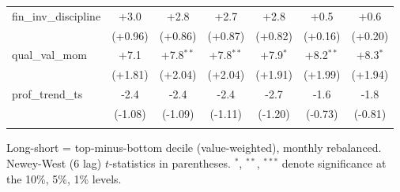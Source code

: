 \begin{table}[htbp]
\begin{threeparttable}
\begin{tabular}{lcccccc}
\addlinespace
fin\_inv\_discipline & +3.0 & +2.8 & +2.7 & +2.8 & +0.5 & +0.6 \\
 & (+0.96) & (+0.86) & (+0.87) & (+0.82) & (+0.16) & (+0.20) \\
\addlinespace
qual\_val\_mom & +7.1 & +7.8$^{**}$ & +7.8$^{**}$ & +7.9$^{*}$ & +8.2$^{**}$ & +8.3$^{*}$ \\
 & (+1.81) & (+2.04) & (+2.04) & (+1.91) & (+1.99) & (+1.94) \\
\addlinespace
prof\_trend\_ts & -2.4 & -2.4 & -2.4 & -2.7 & -1.6 & -1.8 \\
 & (-1.08) & (-1.09) & (-1.11) & (-1.20) & (-0.73) & (-0.81) \\
\addlinespace
\bottomrule
\end{tabular}
\begin{tablenotes}\footnotesize
\item Long-short = top-minus-bottom decile (value-weighted), monthly rebalanced. Newey-West (6 lag) $t$-statistics in parentheses. $^{*}$, $^{**}$, $^{***}$ denote significance at the 10\%, 5\%, 1\% levels.
\end{tablenotes}
\end{threeparttable}
\end{table}